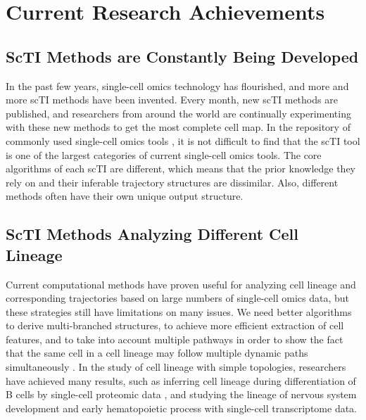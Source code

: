 \chapter{Current Research Achievements} %

\label{Current Research Achievements} %

\section{ScTI Methods are Constantly Being Developed}

In the past few years, single-cell omics technology has flourished, and more and more scTI methods have been invented. Every month, new scTI methods are published, and researchers from around the world are continually experimenting with these new methods to get the most complete cell map. In the repository of commonly used single-cell omics tools \parencite{henry_omictools:_2014,davis_seandavi/awesome-single-cell:_2018,zappia_exploring_2018}, it is not difficult to find that the scTI tool is one of the largest categories of current single-cell omics tools. The core algorithms of each scTI are different, which means that the prior knowledge they rely on and their inferable trajectory structures are dissimilar. Also, different methods often have their own unique output structure.

\section{ScTI Methods Analyzing Different Cell Lineage}

Current computational methods have proven useful for analyzing cell lineage and corresponding trajectories based on large numbers of single-cell omics data, but these strategies still have limitations on many issues. We need better algorithms to derive multi-branched structures, to achieve more efficient extraction of cell features, and to take into account multiple pathways in order to show the fact that the same cell in a cell lineage may follow multiple dynamic paths simultaneously \parencite{ferrell_bistability_2012}. In the study of cell lineage with simple topologies, researchers have achieved many results, such as inferring cell lineage during differentiation of B cells by single-cell proteomic data 
\parencite{bendall_single-cell_2014}, and studying the lineage of nervous system development
\parencite{habib_div-seq:_2016,chen_mpath_2016,shin_single-cell_2015} and early hematopoietic process
\parencite{nestorowa_single-cell_2016} with single-cell transcriptome data. \\

